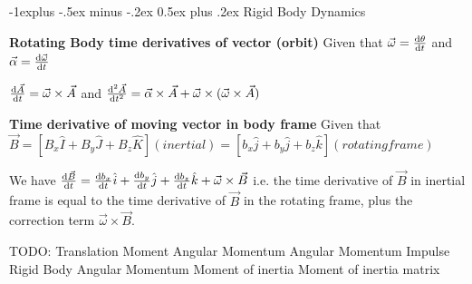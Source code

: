 \documentclass[letterpaper, 8pt]{extarticle}
\makeatletter
\renewcommand{\subsection}{\@startsection{subsection}{2}{0mm}%
                                {-1explus -.5ex minus -.2ex}%
                                {0.5ex plus .2ex}%
                                {\normalfont\small\bfseries}}
\makeatother
\begin{document}
\begin{multicols*}{4}
\subsection{Rigid Body Dynamics}

\textbf{Rotating Body time derivatives of vector (orbit)}
Given that $\vec{\omega} = \odv{\theta}{t}$ and $\vec{\alpha} = \odv{\vec\omega}{t}$

$
\odv{\vec{A}}{t} = \vec{\omega} \times \vec{A}
$
and
$
\odv[2]{\vec{A}}{t} = \vec{\alpha} \times \vec{A} + \vec{\omega} \times (\vec{\omega} \times \vec{A})
$

\textbf{Time derivative of moving vector in body frame}
Given that $\vec{B} = [B_x \hat{I} + B_y \hat{J} + B_z \hat{K}] (inertial) = [b_x \hat{j} + b_y \hat{j} + b_z \hat{k}] (rotating frame)$

We have
$
\odv{\vec{B}}{t} = \odv{b_x}{t} \hat{i} + \odv{b_y}{t} \hat{j} + \odv{b_z}{t} \hat{k} + \vec{\omega} \times \vec{B}
$
i.e. the time derivative of $\vec{B}$ in inertial frame is equal to the time derivative of $\vec{B}$ in the rotating frame,
plus the correction term $\vec{\omega} \times \vec{B}$.

TODO:
Translation
Moment
Angular Momentum
Angular Momentum Impulse
Rigid Body Angular Momentum
Moment of inertia
Moment of inertia matrix


\end{multicols*}
\end{document}
